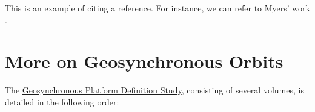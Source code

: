 \documentclass{article}
\begin{document}
This is an example of citing a reference. For instance, we can refer to Myers' work \cite{Myers1973_vol_I}.

\section{More on Geosynchronous Orbits}
The \href{https://ntrs.nasa.gov/search?q=Geosynchronous\%20platform\%20definition\%20study}{Geosynchronous Platform Definition Study}, consisting of several volumes, is detailed in the following order: 
\cite{Myers1973_vol_I, Myers1973_vol_II, Myers1973_vol_III, Myers1973_vol_IV_Part1, Myers1973_vol_IV_Part2, Myers1973_vol_V, Myers1973_vol_VI, Myers1973_vol_VII}

\printbibliography
\end{document}
